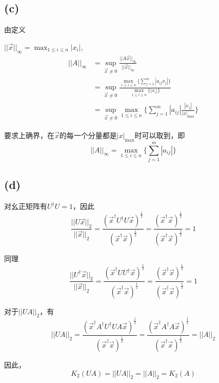 \documentclass[UTF8]{ctexart}
\begin{document}
\subsection*{(c)}
由定义

$||\vec{x}||_\infty=\max_{1\leq i\leq n}|x_i|$,
\begin{equation*}
    \begin{aligned}
        ||A||_\infty&=\sup_{\vec{x}\ne0}\frac{||A\vec{x}||_\infty}{||\vec{x}||_\infty}\\
        &=\sup_{\vec{x}\ne0}\frac{\max_{1\leq i\leq n}\{\sum_{j=1}^{m}|a_{ij}x_j|\}}{\max_{1\leq i\leq n}\{|x_i|\}}\\
        &=\sup_{\vec{x}\ne0}\max_{1\leq i\leq n}\{\sum_{j=1}^{m}|a_{ij}|\frac{|x_j|}{|x|_{\max}}\}
    \end{aligned}
\end{equation*}

要求上确界，在$\vec{x}$的每一个分量都是${|x|_{\max}}$时可以取到，即
\begin{equation*}
    ||A||_\infty=\max_{1\leq i\leq n}\{\sum_{j=1}^{m}|a_{ij}|\}
\end{equation*}

\subsection*{(d)}
对幺正矩阵有$U^\dagger U=1$，因此\begin{equation*}
    \frac{||U\vec{x}||_2}{||\vec{x}||_2}=\frac{(\vec{x}^\dagger U^\dagger U \vec{x})^\frac{1}{2}}{(\vec{x}^\dagger\vec{x})^\frac{1}{2}}=\frac{(\vec{x}^\dagger\vec{x})^\frac{1}{2}}{(\vec{x}^\dagger\vec{x})^\frac{1}{2}}=1
\end{equation*}

同理
\begin{equation*}
    \frac{||U^\dagger\vec{x}||_2}{||\vec{x}||_2}=\frac{(\vec{x}^\dagger U U^\dagger \vec{x})^\frac{1}{2}}{(\vec{x}^\dagger\vec{x})^\frac{1}{2}}=\frac{(\vec{x}^\dagger\vec{x})^\frac{1}{2}}{(\vec{x}^\dagger\vec{x})^\frac{1}{2}}=1
\end{equation*}

对于$||UA||_2$，有
\begin{equation*}
    ||UA||_2=\frac{(\vec{x}^\dagger  A^\dagger U^\dagger U A \vec{x})^\frac{1}{2}}{(\vec{x}^\dagger\vec{x})^\frac{1}{2}}=\frac{(\vec{x}^\dagger  A^\dagger A \vec{x})^\frac{1}{2}}{(\vec{x}^\dagger\vec{x})^\frac{1}{2}}=||A||_2
\end{equation*}

因此，\begin{equation*}
    K_2(UA)=||UA||_2=||A||_2=K_2(A)
\end{equation*}
\end{document}
